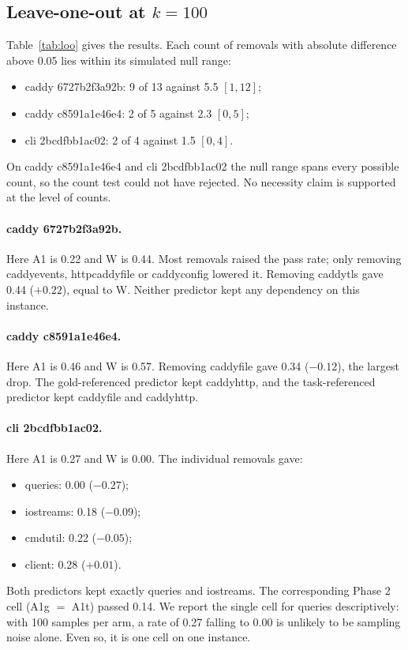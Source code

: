 \documentclass[10pt]{article}
\begin{document}
\subsection{Leave-one-out at $k=100$}

Table~\ref{tab:loo} gives the results. Each count of removals with absolute difference above 0.05 lies within its simulated null range:
\begin{itemize}
\item caddy 6727b2f3a92b: 9 of 13 against 5.5 $[1, 12]$;
\item caddy c8591a1e46e4: 2 of 5 against 2.3 $[0, 5]$;
\item cli 2bcdfbb1ac02: 2 of 4 against 1.5 $[0, 4]$.
\end{itemize}
On caddy c8591a1e46e4 and cli 2bcdfbb1ac02 the null range spans every possible count, so the count test could not have rejected. No necessity claim is supported at the level of counts.

\paragraph{caddy 6727b2f3a92b.} Here A1 is 0.22 and W is 0.44. Most removals raised the pass rate; only removing caddyevents, httpcaddyfile or caddyconfig lowered it. Removing caddytls gave 0.44 ($+0.22$), equal to W. Neither predictor kept any dependency on this instance.

\paragraph{caddy c8591a1e46e4.} Here A1 is 0.46 and W is 0.57. Removing caddyfile gave 0.34 ($-0.12$), the largest drop. The gold-referenced predictor kept caddyhttp, and the task-referenced predictor kept caddyfile and caddyhttp.

\paragraph{cli 2bcdfbb1ac02.} Here A1 is 0.27 and W is 0.00. The individual removals gave:
\begin{itemize}
\item queries: 0.00 ($-0.27$);
\item iostreams: 0.18 ($-0.09$);
\item cmdutil: 0.22 ($-0.05$);
\item client: 0.28 ($+0.01$).
\end{itemize}
Both predictors kept exactly queries and iostreams. The corresponding Phase 2 cell (A1g $=$ A1t) passed 0.14. We report the single cell for queries descriptively: with 100 samples per arm, a rate of 0.27 falling to 0.00 is unlikely to be sampling noise alone. Even so, it is one cell on one instance.
\end{document}

